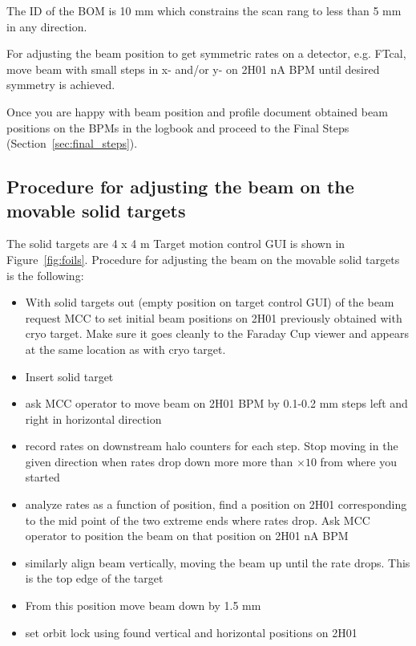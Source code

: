 The ID of the BOM is 10 mm which constrains the scan rang to less than 5 mm in any direction.

For adjusting the beam position to get symmetric rates on a detector, e.g. FTcal, move beam with small steps in x- and/or y- on 2H01 nA BPM until desired symmetry is achieved.  
\vspace{1.cm}

Once you are happy with beam position and profile document obtained beam positions on the BPMs in the logbook and proceed to the Final Steps (Section~\ref{sec:final_steps}).

\subsection{Procedure for adjusting the beam on the movable solid targets} 

The solid targets are 4 x 4 m
Target motion control GUI is shown in Figure~\ref{fig:foils}.
Procedure for adjusting the beam on the movable solid targets is the following:

\begin{itemize}
\item With solid targets out (empty position on target control GUI) of the beam request MCC to set initial beam positions on 2H01 previously obtained with cryo target. Make sure it goes cleanly to the Faraday Cup viewer and appears at the same location as with cryo target.
\item Insert solid target
\item ask MCC operator to move beam on 2H01 BPM by 0.1-0.2 mm steps left and right in horizontal direction
\item record rates on downstream halo counters for each step. Stop moving in the given direction when rates drop down more more than $\times 10$ from where you started 
\item analyze rates as a function of position, find a position on 2H01 corresponding to the mid point of the two extreme ends where rates drop. Ask MCC operator to position the beam on that position on 2H01 nA BPM
\item  similarly align beam vertically, moving the beam up until the rate drops. This is the top edge of the target
\item From this position move beam down by 1.5 mm
\item set orbit lock using found vertical and horizontal positions on 2H01 
\end{itemize}

